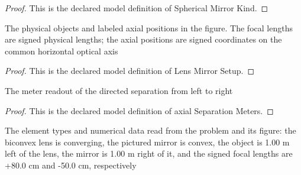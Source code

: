\begin{proof}
  This is the declared model definition of Spherical Mirror Kind.
\end{proof}
\begin{definition}
  \label{def:physics:phyx-mini-0030:phyxminiproblems-problemphyxmini0030-lensmirrorsetup}
  The physical objects and labeled axial positions in the figure. The focal lengths are signed physical lengths; the axial positions are signed coordinates on the common horizontal optical axis
\end{definition}
\begin{proof}
  This is the declared model definition of Lens Mirror Setup.
\end{proof}
\begin{definition}
  \label{def:physics:phyx-mini-0030:phyxminiproblems-problemphyxmini0030-axialseparationmeters}
  The meter readout of the directed separation from left to right
\end{definition}
\begin{proof}
  This is the declared model definition of axial Separation Meters.
\end{proof}
\begin{definition}
  \label{def:physics:phyx-mini-0030:phyxminiproblems-problemphyxmini0030-matchesfigurereadout}
  The element types and numerical data read from the problem and its figure: the biconvex lens is converging, the pictured mirror is convex, the object is 1.00 m left of the lens, the mirror is 1.00 m right of it, and the signed focal lengths are +80.0 cm and -50.0 cm, respectively
\end{definition}
